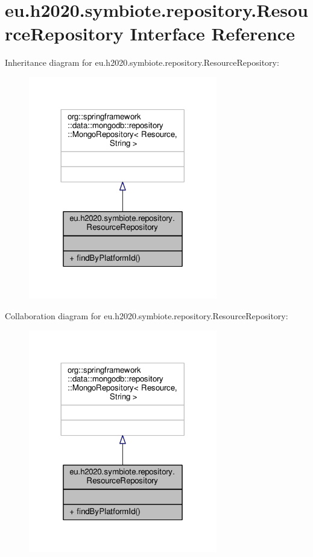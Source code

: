 \hypertarget{interfaceeu_1_1h2020_1_1symbiote_1_1repository_1_1ResourceRepository}{}\section{eu.\+h2020.\+symbiote.\+repository.\+Resource\+Repository Interface Reference}
\label{interfaceeu_1_1h2020_1_1symbiote_1_1repository_1_1ResourceRepository}


Inheritance diagram for eu.\+h2020.\+symbiote.\+repository.\+Resource\+Repository\+:
\nopagebreak
\begin{figure}[H]
\begin{center}
\leavevmode
\includegraphics[width=233pt]{interfaceeu_1_1h2020_1_1symbiote_1_1repository_1_1ResourceRepository__inherit__graph}
\end{center}
\end{figure}


Collaboration diagram for eu.\+h2020.\+symbiote.\+repository.\+Resource\+Repository\+:
\nopagebreak
\begin{figure}[H]
\begin{center}
\leavevmode
\includegraphics[width=233pt]{interfaceeu_1_1h2020_1_1symbiote_1_1repository_1_1ResourceRepository__coll__graph}
\end{center}
\end{figure}
